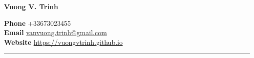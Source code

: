 \documentclass[a4paper,11pt]{article}
\newcommand\tab[1][1cm]{\hspace*{#1}}
\begin{document}
{\hspace*{-\marginparsep minus \marginparwidth} 
\begin{minipage}[t]{\textwidth+\marginparwidth+\marginparsep} 
{\LARGE \bfseries {Vuong V. Trinh}} 

\vspace{0.2cm} 
\textbf{Phone} \tab[0.75cm] {\color{darkblue} +33673023455} \\
\textbf{Email} \tab[0.75cm] \href{mailto:vanvuong.trinh@gmail.com}{vanvuong.trinh@gmail.com} \\
\textbf{Website} \tab[0.435cm]  \href{https://vuongvtrinh.github.io}{https://vuongvtrinh.github.io} \\
\vspace{-0.6cm}

\rule{\columnwidth}{1pt}
\end{minipage}}

\vspace{0.5cm}
\end{document}
